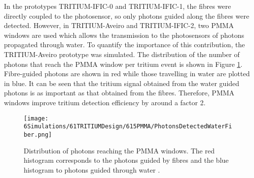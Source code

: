 In the prototypes TRITIUM-IFIC-0 and TRITIUM-IFIC-1, the fibres were directly coupled to the photosensor, so only photons guided along the fibres were detected. However, in TRITIUM-Aveiro and TRITIUM-IFIC-2, two PMMA windows are used which allows the transmission to the photosensors of photons propagated through water. To quantify the importance of this contribution, the TRITIUM-Aveiro prototype was simulated. The distribution of the number of photons that reach the PMMA window per tritium event is shown in Figure \ref{fig:PMMAEffect}. Fibre-guided photons are shown in red while those travelling in water are plotted in blue. It can be seen that the tritium signal obtained from the water guided photons is as important as that obtained from the fibres. Therefore, PMMA windows improve tritium detection efficiency by around a factor 2.

\begin{figure}[hbtp]
\centering
\texttt{[image: 6Simulations/61TRITIUMDesign/615PMMA/PhotonsDetectedWaterFiber.png]}
\caption{Distribution of photons reaching the PMMA windows. The red histogram corresponds to the photons guided by fibres and the blue histogram to photons guided through water \cite{SimulationPaperCarlos}.\label{fig:PMMAEffect}}
\end{figure}

